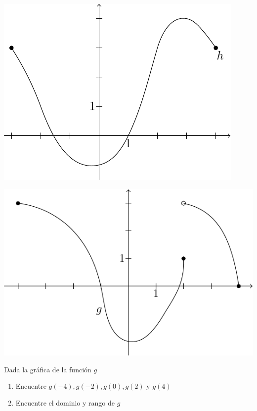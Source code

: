 \documentclass[10pt,twoside]{article}
\begin{document}
\begin{enumerate}
\begin{minipage}{.4\textwidth}
\includegraphics[scale=.75]{asys/funcion_h.pdf} 
\end{minipage}
\begin{minipage}{.4\textwidth}
\includegraphics[scale=.75]{asys/funcion_g.pdf} 
\end{minipage}\hfill
\begin{minipage}{.5\textwidth}
  \item Dada la gráfica de la función $ g $
  \begin{enumerate}
    \item Encuentre $ g(-4), g(-2), g(0), g(2) $ y $ g(4) $
    \item Encuentre el dominio y rango de $ g $
  \end{enumerate}
\end{minipage}
\begin{minipage}{.55\textwidth}

\end{minipage}
\end{enumerate}
\end{document}
